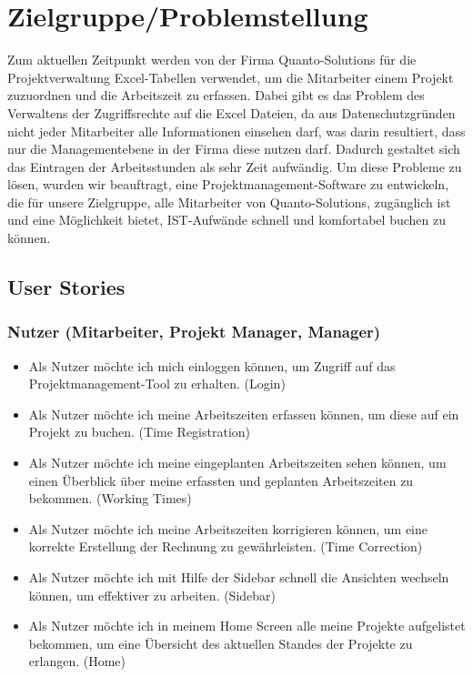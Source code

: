 \documentclass{article}
\begin{document}
\newpage

\section{Zielgruppe/Problemstellung}
Zum aktuellen Zeitpunkt werden von der Firma Quanto-Solutions für die
Projektverwaltung Excel-Tabellen verwendet, um die Mitarbeiter einem Projekt
zuzuordnen und die Arbeitszeit zu erfassen. Dabei gibt es das Problem des
Verwaltens der Zugriffsrechte auf die Excel Dateien, da aus Datenschutzgründen
nicht jeder Mitarbeiter alle Informationen einsehen darf, was darin resultiert,
dass nur die Managementebene in der Firma diese nutzen darf. Dadurch gestaltet
sich das Eintragen der Arbeitsstunden als sehr Zeit aufwändig. Um diese
Probleme zu lösen, wurden wir beauftragt, eine Projektmanagement-Software zu
entwickeln, die für unsere Zielgruppe, alle Mitarbeiter von Quanto-Solutions,
zugänglich ist und eine Möglichkeit bietet, IST-Aufwände schnell und
komfortabel buchen zu können.

\subsection{ User Stories}
\subsubsection{Nutzer (Mitarbeiter, Projekt Manager, Manager) }
\begin{itemize}
    \item Als Nutzer möchte ich mich einloggen können, um Zugriff auf das
          Projektmanagement-Tool zu erhalten. (Login)
    \item Als Nutzer möchte ich meine Arbeitszeiten erfassen können, um diese auf ein
          Projekt zu buchen. (Time Registration)
    \item Als Nutzer möchte ich meine eingeplanten Arbeitszeiten sehen können, um einen
          Überblick über meine erfassten und geplanten Arbeitszeiten zu bekommen.
          (Working Times)
    \item Als Nutzer möchte ich meine Arbeitszeiten korrigieren können, um eine korrekte
          Erstellung der Rechnung zu gewährleisten. (Time Correction)
    \item Als Nutzer möchte ich mit Hilfe der Sidebar schnell die Ansichten wechseln
          können, um effektiver zu arbeiten. (Sidebar)
    \item Als Nutzer möchte ich in meinem Home Screen alle meine Projekte aufgelistet
          bekommen, um eine Übersicht des aktuellen Standes der Projekte zu erlangen.
          (Home)
\end{itemize}
\end{document}
